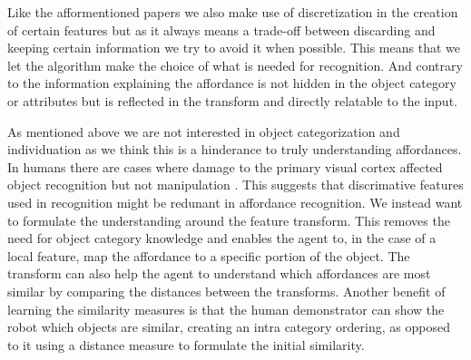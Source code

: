 Like the afformentioned papers we also make use of discretization in the
creation of certain features but as it always means a trade-off between
discarding and keeping certain information we try to avoid it when
possible. This means that we let the algorithm make the choice of what
is needed for recognition. And contrary to
\cite{Hermans:2011vz, JieSun:2010kv} the information explaining the
affordance is not hidden in the object category or attributes but is
reflected in the transform and directly relatable to the input.

As mentioned above we are not interested in object categorization and
individuation as we think this is a hinderance to truly understanding
affordances. In humans there are cases where damage to the primary
visual cortex affected object recognition but not manipulation
\cite{Goodale:1991hc}. This suggests that discrimative features used in
recognition might be redunant in affordance recognition. We instead want
to formulate the understanding around the feature transform. This
removes the need for object category knowledge and enables the agent to,
in the case of a local feature, map the affordance to a specific portion
of the object. The transform can also help the agent to understand which
affordances are most similar by comparing the distances between the
transforms. Another benefit of learning the similarity measures is that
the human demonstrator can show the robot which objects are similar,
creating an intra category ordering, as opposed to it using a distance
measure to formulate the initial similarity.

\cite{Stark:2008bx}

